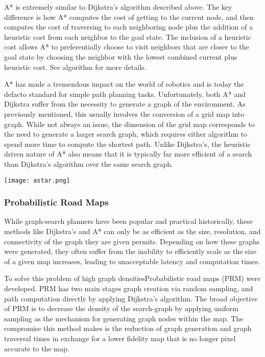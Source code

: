 A* is extremely similar to Dijkstra's algorithm described above. The key difference is how A* computes the cost of getting to the current node, and then computes the cost of traversing to each neighboring node plus the addition of a heuristic cost from each neighbor to the goal state. The inclusion of a heuristic cost allows A* to preferentially choose to visit neighbors that are closer to the goal state by choosing the neighbor with the lowest combined current plus heuristic cost. See algorithm for more details.

A* has made a tremendous impact on the world of robotics and is today the defacto standard for simple path planning tasks. Unfortunately, both A* and Dijkstra suffer from the necessity to generate a graph of the environment. As previously mentioned, this usually involves the conversion of a grid map into graph. While not always an issue, the dimension of the grid map corresponds to the need to generate a larger search graph, which requires either algorithm to spend more time to compute the shortest path. Unlike Dijkstra's, the heuristic driven nature of A* also means that it is typically far more efficient of a search than Dijkstra's algorithm over the same search graph. 

\texttt{[image: astar.png]}

\subsubsection{Probabilistic Road Maps}

While graph-search planners have been popular and practical historically, these methods like Dijkstra's and A* can only be as efficient as the size, resolution, and connectivity of the graph they are given permits. Depending on how these graphs were generated, they often suffer from the inability to efficiently scale as the size of a given map increases, leading to unacceptable latency and computation times. 

To solve this problem of high graph densitiesProbabilistic road maps (PRM) were developed. PRM has two main stages graph creation via random sampling, and path computation directly by applying Dijkstra's algorithm. The broad objective of PRM is to decrease the density of the search-graph by applying uniform sampling as the mechanism for generating graph nodes within the map. The compromise this method makes is the reduction of graph generation and graph traversal times in exchange for a lower fidelity map that is no longer pixel accurate to the map.

